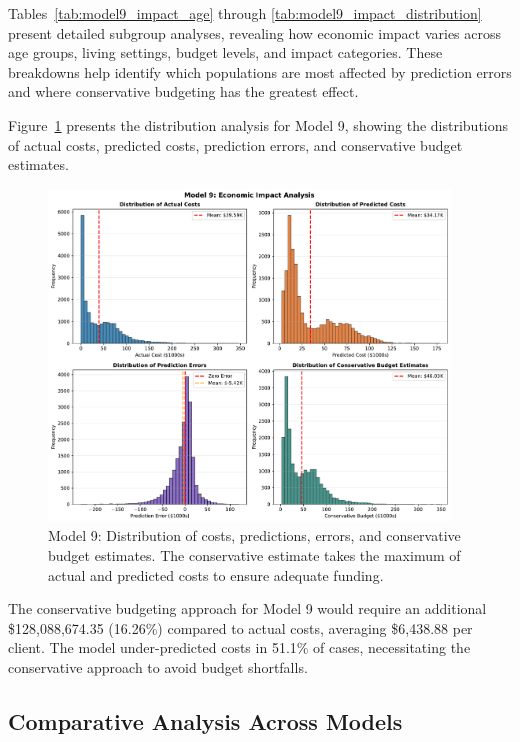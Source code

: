 Tables~\ref{tab:model9_impact_age} through \ref{tab:model9_impact_distribution} present detailed subgroup analyses, revealing how economic impact varies across age groups, living settings, budget levels, and impact categories. These breakdowns help identify which populations are most affected by prediction errors and where conservative budgeting has the greatest effect.

Figure~\ref{fig:model9_impact_histograms} presents the distribution analysis for Model 9, showing the distributions of actual costs, predicted costs, prediction errors, and conservative budget estimates.

\begin{figure}[htbp]
\centering
\includegraphics[width=0.95\textwidth]{figures/model_9_Impact_Histograms.pdf}
\caption{Model 9: Distribution of costs, predictions, errors, and conservative budget estimates. The conservative estimate takes the maximum of actual and predicted costs to ensure adequate funding.}
\label{fig:model9_impact_histograms}
\end{figure}

The conservative budgeting approach for Model 9 would require an additional \$128,088,674.35 (16.26\%) compared to actual costs, averaging \$6,438.88 per client. The model under-predicted costs in 51.1\% of cases, necessitating the conservative approach to avoid budget shortfalls. 

\clearpage

\subsection{Comparative Analysis Across Models}
\label{subsec:comparative_impact}

